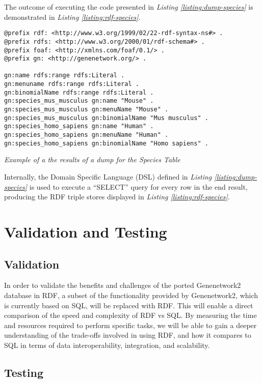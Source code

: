 The outcome of executing the code presented in \textit{Listing \ref{listing:dump-species}} is demonstrated in \textit{Listing \ref{listing:rdf-species}}.

\begin{listing}[H]
\begin{verbatim}
@prefix rdf: <http://www.w3.org/1999/02/22-rdf-syntax-ns#> .
@prefix rdfs: <http://www.w3.org/2000/01/rdf-schema#> .
@prefix foaf: <http://xmlns.com/foaf/0.1/> .
@prefix gn: <http://genenetwork.org/> .

gn:name rdfs:range rdfs:Literal .
gn:menuname rdfs:range rdfs:Literal .
gn:binomialName rdfs:range rdfs:Literal .
gn:species_mus_musculus gn:name "Mouse" .
gn:species_mus_musculus gn:menuName "Mouse" .
gn:species_mus_musculus gn:binomialName "Mus musculus" .
gn:species_homo_sapiens gn:name "Human" .
gn:species_homo_sapiens gn:menuName "Human" .
gn:species_homo_sapiens gn:binomialName "Homo sapiens" .
\end{verbatim}
\caption{\textit{Example of a the results of a dump for the Species Table}}
\label{listing:rdf-species}
\end{listing}

Internally, the Domain Specific Language (DSL) defined in \textit{Listing \ref{listing:dump-species}} is used to execute a ``SELECT'' query for every row in the end result, producing the RDF triple stores displayed in \textit{Listing \ref{listing:rdf-species}}.

\section{Validation and Testing}

\subsection{Validation}

In order to validate the benefits and challenges of the ported Genenetwork2 database in RDF, a subset of the functionality provided by Genenetwork2, which is currently based on SQL, will be replaced with RDF.  This will enable a direct comparison of the speed and complexity of RDF vs SQL.  By measuring the time and resources required to perform specific tasks, we will be able to gain a deeper understanding of the trade-offs involved in using RDF, and how it compares to SQL in terms of data interoperability, integration, and scalability.

\subsection{Testing}

